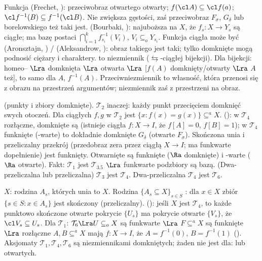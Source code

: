Funkcja   (Frechet, ): przeciwobraz otwartego otwarty; $f(\cl A) \subseteq \cl f(a)$; $\cl f^{-1}(B) \subseteq f^{-1}(\cl B)$. %
Nie zwiększa gęstości, zaś przeciwobraz $F_\sigma$, $G_\delta$ lub borelowskiego też taki jest.
 (Bourbaki, ): najuboższa na $X$, że $f_s \colon X \to Y_s$ są ciągłe; ma bazę postaci $\bigcap_{i=1}^k f_{s_i}^{-1}(V_i)$, $V_i \subseteq_o Y_{s_i}$.
Funkcja ciągła może być  (Aronsztajn, ) /  (Aleksandrow, ): obraz takiego jest taki; tylko domknięte mogą podnosić ciężary i charaktery.
 to niezmiennik  ($\leftrightarrows$-ciągłej bijekcji).
Dla bijekcji: homeo-- $\Lra$ domknięta $\Lra$ otwarta $\Lra$ [$f(A)$ domknięty/otwarty $\Lra$ $A$ też], to samo dla $A$, $f^{-1}(A)$.
Przeciwniezmiennik to własność, która przenosi się z obrazu na przestrzeń argumentów; niezmiennik zaś z przestrzeni na obraz.

  (punkty i zbiory domknięte).
$\mathcal T_2$ inaczej: każdy punkt przecięciem domknięć swych otoczeń.
Dla ciągłych $f, g$ w $\mathcal T_2$ jest $\{x : f(x) = g(x)\} \subseteq^a X$.
 (): w $\mathcal T_4$ rozłączne, domknięte są  (istnieje ciągła $f \colon X \to I$, że $f[A] = 0$, $f[B] = 1$); w $\mathcal T_4$ funknięte (-warte) to dokładnie domknięte $G_\delta$ (otwarte $F_\sigma$).
Skończona unia i przeliczalny przekrój  (przedobraz zera przez ciągłą $X \to I$; ma funkwarte dopełnienie) jest funknięty.
Otwarnięte są funknięte ($\Ra$ domknięte) i -warte ($\Ra$ otwarte).
Fakt: $\mathcal T_1$ jest $\mathcal T_{3.5}$ $\Lra$ funkwarte podzbiory są bazą.
(Dwa-przeliczalna lub przeliczalna) $\mathcal T_3$ jest $\mathcal T_4$.
Dwa-przeliczalna $\mathcal T_4$ jest $\mathcal T_6$.

 $X$: rodzina $A_s$, których unia to $X$.
Rodzina $\{A_s \subseteq X\}_{s \in S}$ : dla $x \in X$ zbiór $\{s \in S : x \in A_s\}$ jest skończony (przeliczalny).
 (): jeśli $X$ jest $\mathcal T_4$, to każde punktowo skończone otwarte pokrycie $\{U_s\}$ ma pokrycie otwarte $\{V_s\}$, że $\cl V_s \subseteq U_s$.
Dla $\mathcal T_1$: $\mathcal T_6 \Lra U \subseteq_o X$ są funkwarte $\Lra$ $F \subseteq^a X$ są funknięte $\Lra$ rozłączne $A, B \subseteq^a X$ mają $f \colon X \to I$, że $A = f^{-1}(0)$, $B = f^{-1}(1)$ ().
Aksjomaty $\mathcal T_1, \mathcal T_4, \mathcal T_6$ są niezmiennikami domkniętych; żaden nie jest dla:  lub otwartych.

